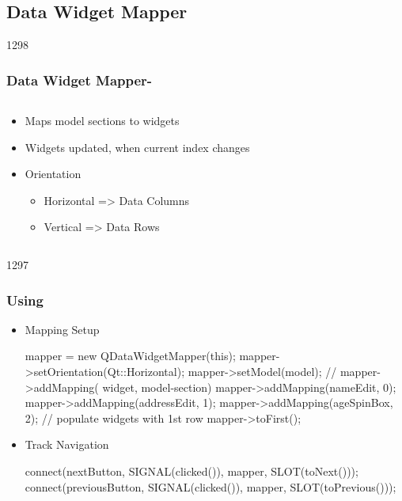 %
%
%
%

\subsection{Data Widget Mapper}

\begin{slide}[fragile]{1298}
  \frametitle{Data Widget Mapper- }
 \begin{columns}[t]
    \begin{column}{6cm}
      \begin{itemize}
      \item Maps model sections to widgets
      \item Widgets updated, when current index changes
      \item Orientation
        \begin{itemize}
        \item Horizontal => Data Columns
        \item Vertical => Data Rows
        \end{itemize}
     \end{itemize}
   \end{column}
   \begin{column}{4cm}
   \end{column}
 \end{columns}
\end{slide}

\begin{slide}[fragile]{1297}
  \frametitle{Using }
  \begin{itemize}
  \item Mapping Setup
 \begin{cpp}
mapper = new QDataWidgetMapper(this);
mapper->setOrientation(Qt::Horizontal);
mapper->setModel(model);
// mapper->addMapping( widget, model-section)
mapper->addMapping(nameEdit, 0);
mapper->addMapping(addressEdit, 1);
mapper->addMapping(ageSpinBox, 2);
// populate widgets with 1st row
mapper->toFirst();
  \end{cpp}
\item Track Navigation
  \begin{cpp}
connect(nextButton, SIGNAL(clicked()), 
          mapper, SLOT(toNext()));    
connect(previousButton, SIGNAL(clicked()), 
          mapper, SLOT(toPrevious()));    
  \end{cpp}
  \end{itemize}
\end{slide}

